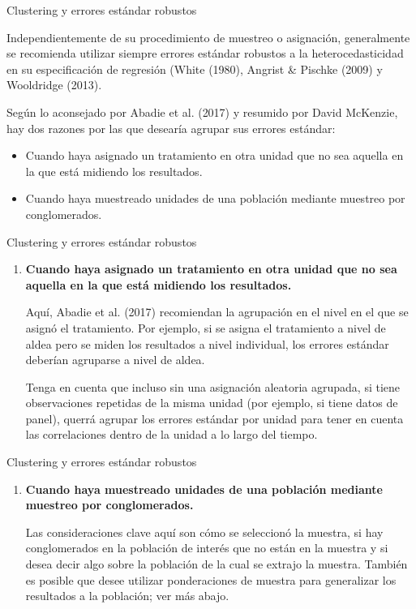 \documentclass[11pt, aspectratio=169, compress]{beamer}
\newcommand\setItemnumber[1]{\setcounter{enumi}{\numexpr#1-1\relax}}
\begin{document}
\begin{frame}{Clustering y errores estándar robustos}

  Independientemente de su procedimiento de muestreo o asignación, generalmente se recomienda utilizar siempre errores estándar robustos a la heterocedasticidad en su especificación de regresión (White (1980), Angrist \& Pischke (2009) y Wooldridge (2013).

  Según lo aconsejado por Abadie et al. (2017) y resumido por David McKenzie, hay dos razones por las que desearía agrupar sus errores estándar:
  
  \begin{itemize}
    \item Cuando haya asignado un tratamiento en otra unidad que no sea aquella en la que está midiendo los resultados.
    \item Cuando haya muestreado unidades de una población mediante muestreo por conglomerados.
  \end{itemize}

\end{frame}
\begin{frame}{Clustering y errores estándar robustos}

  \begin{enumerate}
    \item \textbf{Cuando haya asignado un tratamiento en otra unidad que no sea aquella en la que está midiendo los resultados.}
    
    Aquí, Abadie et al. (2017) recomiendan la agrupación en el nivel en el que se asignó el tratamiento. Por ejemplo, si se asigna el tratamiento a nivel de aldea pero se miden los resultados a nivel individual, los errores estándar deberían agruparse a nivel de aldea. 
    
    Tenga en cuenta que incluso sin una asignación aleatoria agrupada, si tiene observaciones repetidas de la misma unidad (por ejemplo, si tiene datos de panel), querrá agrupar los errores estándar por unidad para tener en cuenta las correlaciones dentro de la unidad a lo largo del tiempo.
 
  \end{enumerate}
\end{frame}
\begin{frame}{Clustering y errores estándar robustos}

  \begin{enumerate}
    \setItemnumber{2}
    \item \textbf{Cuando haya muestreado unidades de una población mediante muestreo por conglomerados.}
    
    Las consideraciones clave aquí son cómo se seleccionó la muestra, si hay conglomerados en la población de interés que no están en la muestra y si desea decir algo sobre la población de la cual se extrajo la muestra. También es posible que desee utilizar ponderaciones de muestra para generalizar los resultados a la población; ver más abajo.
  \end{enumerate}
\end{frame}
\end{document}
